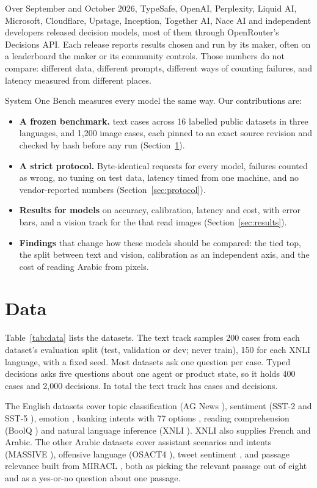 \documentclass[11pt]{article}
\begin{document}
Over September and October 2026, TypeSafe, OpenAI, Perplexity, Liquid AI, Microsoft, Cloudflare, Upstage, Inception,
Together AI, Nace AI and independent developers released decision models, most of them through OpenRouter's
Decisions API. Each release reports results chosen and run by its maker, often on a leaderboard the maker or its
community controls. Those numbers do not compare: different data, different prompts, different ways of counting
failures, and latency measured from different places.

System One Bench measures every model the same way. Our contributions are:
\begin{itemize}
  \item \textbf{A frozen benchmark.} \nCases{} text cases across 16 labelled public datasets in three languages,
  and 1{,}200 image cases, each pinned to an exact source revision and checked by hash before any run
  (Section~\ref{sec:data}).
  \item \textbf{A strict protocol.} Byte-identical requests for every model, failures counted as wrong, no tuning on
  test data, latency timed from one machine, and no vendor-reported numbers (Section~\ref{sec:protocol}).
  \item \textbf{Results for \nModels{} models} on accuracy, calibration, latency and cost, with error bars, and a
  vision track for the \nVision{} that read images (Section~\ref{sec:results}).
  \item \textbf{Findings} that change how these models should be compared: the tied top, the split between text and
  vision, calibration as an independent axis, and the cost of reading Arabic from pixels.
\end{itemize}

\section{Data}\label{sec:data}

Table~\ref{tab:data} lists the datasets. The text track samples 200 cases from each dataset's evaluation split (test, validation or
dev; never train), 150 for each XNLI language, with a fixed seed. Most datasets ask one question per case. Typed decisions
\citep{typeddecisions} asks five questions about one agent or product state, so it holds 400 cases and 2{,}000
decisions. In total the text track has \nCases{} cases and \nDecisions{} decisions.

The English datasets cover topic classification (AG News \citep{zhang2015character}), sentiment (SST-2 and SST-5
\citep{socher2013recursive}), emotion \citep{saravia2018carer}, banking intents with 77 options
\citep{casanueva2020efficient}, reading comprehension (BoolQ \citep{clark2019boolq}) and natural language inference
(XNLI \citep{conneau2018xnli}). XNLI also supplies French and Arabic. The other Arabic datasets cover assistant
scenarios and intents (MASSIVE \citep{fitzgerald2023massive}), offensive language (OSACT4 \citep{mubarak2020osact4}),
tweet sentiment \citep{barbieri2022xlmt}, and passage relevance built from MIRACL \citep{zhang2023miracl}, both as
picking the relevant passage out of eight and as a yes-or-no question about one passage.
\end{document}
